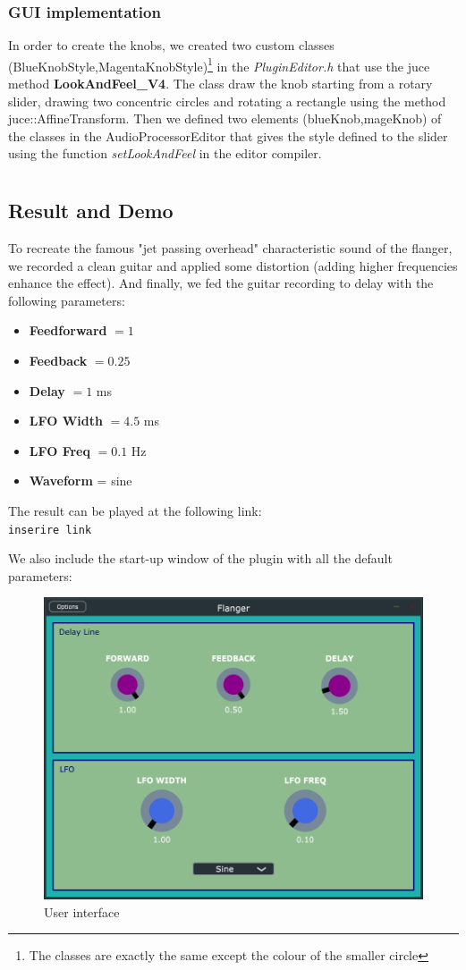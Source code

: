 \documentclass[a4paper,12pt]{report}
\begin{document}
\subsection{GUI implementation}
In order to create the knobs, we created two custom classes (BlueKnobStyle,MagentaKnobStyle)\footnote{The classes are exactly the same except the colour of the smaller circle} in the \emph{PluginEditor.h} that use the juce method \textbf{LookAndFeel\_V4}. The class draw the knob starting from a rotary slider, drawing two concentric circles and rotating a rectangle using the method juce::AffineTransform. Then we defined two elements (blueKnob,mageKnob) of the classes in the AudioProcessorEditor that gives the style defined to the slider using the function \emph{setLookAndFeel} in the editor compiler.

\chapter{}
\section{Result and Demo}
To recreate the famous "jet passing overhead" characteristic sound of the flanger, we recorded a clean guitar and applied some distortion (adding higher frequencies enhance the effect). And finally, we fed the guitar recording to delay with the following parameters:
\begin{itemize}
\item \textbf{Feedforward} $= 1$
\item \textbf{Feedback} $= 0.25$
\item \textbf{Delay} $= 1$ ms
\item \textbf{LFO Width} $= 4.5$ ms 
\item \textbf{LFO Freq} $= 0.1$ Hz
\item \textbf{Waveform} = sine
\end{itemize}

The result can be played at the following link:\\ \verb"inserire link"


\newpage
We also include the start-up window of the plugin with all the default parameters:
\begin{figure}[h]
\centering
\includegraphics[scale=0.75]{ui.png}
\caption{User interface}
\end{figure}
\end{document}
